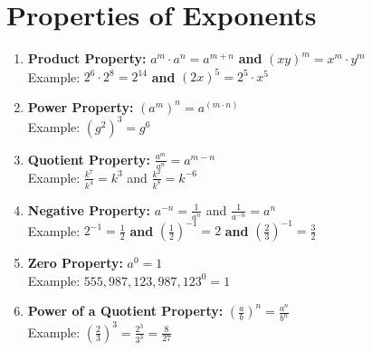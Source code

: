 \documentclass[12pt]{article}
\begin{document}
\section{Properties of Exponents}


\begin{enumerate}
\setlength\itemsep{1cm}

	\item \textbf{Product Property:} $a^m \cdot a^n= a^{m+n}$\hspace{1cm} \textbf{and} \hspace{1cm} $(xy)^m=x^m \cdot y^m$ \\
	
		\hspace{.6in} Example: $2^6 \cdot 2^8=2^{14}$\hspace{1cm}   \textbf{ and}  \hspace{1cm}  $(2x)^{5}=2^5 \cdot x^5$\\ 
	
	\item \textbf{Power Property:} $\left(a^m \right)^n = a^{(m \cdot n)}$\\
	
		\hspace{.6in} Example: $\left(g^2\right)^3=g^6$\\ 
	
	\item \textbf{Quotient Property:} $\frac{a^m}{a^n}=a^{m-n}$\\
	
		\hspace{.6in} Example: $\frac{k^7}{k^4} = k^3$ and $\frac{k^2}{k^8}=k^{-6}$\\ 
	
	\item \textbf{Negative Property:} $a^{-n}=\frac{1}{a^n}$ and $\frac{1}{a^{-n}}=a^{n}$ \\
	
		\hspace{.6in} Example: $2^{-1}=\frac{1}{2}$\hspace{1cm} \textbf{and} \hspace{1cm} $\left(\frac{1}{2}\right)^{-1}=2$ \hspace{1cm} \textbf{and} \hspace{1cm} $\left(\frac{2}{3}\right)^{-1}=\frac{3}{2}$\\ 
	
	\item \textbf{Zero Property:} $a^0=1$\\
		
		\hspace{.6in} Example: $555,987,123,987,123^0=1$\\ 
	
	\item \textbf{Power of a Quotient Property:} $\left(\frac{a}{b}\right)^n=\frac{a^n}{b^n}$\\
	
		\hspace{.6in} Example: $\left(\frac{2}{3}\right)^3=\frac{2^3}{3^3}=\frac{8}{27}$ \\

\end{enumerate}
\end{document}
